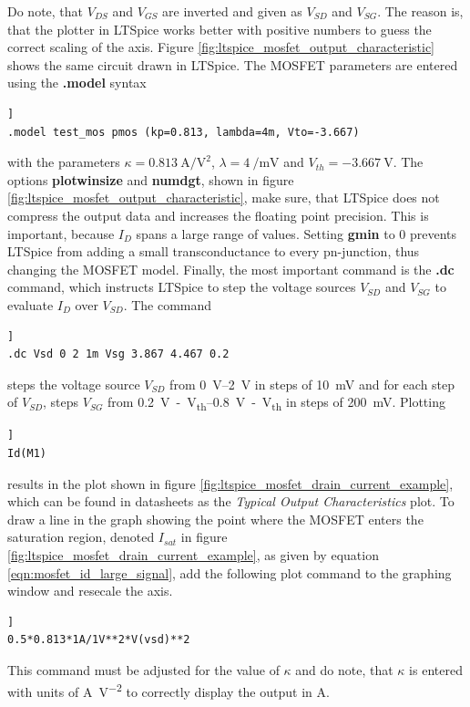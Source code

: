 \documentclass[12pt]{book}
\begin{document}
Do note, that $V_{DS}$ and $V_{GS}$ are inverted and given as $V_{SD}$ and $V_{SG}$. The reason is, that the plotter in LTSpice works better with positive numbers to guess the correct scaling of the axis. Figure \ref{fig:ltspice_mosfet_output_characteristic} shows the same circuit drawn in LTSpice. The MOSFET parameters are entered using the \textbf{.model} syntax
\begin{lstlisting}[frame=single, xleftmargin=5mm, xrightmargin=5mm, columns=fullflexible, morekeywords={model, dc}, keywordstyle=\bfseries, basicstyle=\rmfamily]]
.model test_mos pmos (kp=0.813, lambda=4m, Vto=-3.667)
\end{lstlisting}
with the parameters $\kappa = \qty[per-mode=power]{0.813}{\ampere \per \square\volt}$, $\lambda = \qty[per-mode=power]{4}{\per \milli \volt}$ and $V_{th} = \qty{-3.667}{\V}$. The options \textbf{plotwinsize} and \textbf{numdgt}, shown in figure \ref{fig:ltspice_mosfet_output_characteristic}, make sure, that LTSpice does not compress the output data and increases the floating point precision. This is important, because $I_D$ spans a large range of values. Setting \textbf{gmin} to \num{0} prevents LTSpice from adding a small transconductance to every pn-junction, thus changing the MOSFET model. Finally, the most important command is the \textbf{.dc} command, which instructs LTSpice to step the voltage sources $V_{SD}$ and $V_{SG}$ to evaluate $I_D$ over $V_{SD}$. The command
\begin{lstlisting}[frame=single, xleftmargin=5mm, xrightmargin=5mm, columns=fullflexible, morekeywords={model, dc}, keywordstyle=\bfseries, basicstyle=\rmfamily]]
.dc Vsd 0 2 1m Vsg 3.867 4.467 0.2
\end{lstlisting}
steps the voltage source $V_{SD}$ from \qtyrange[range-units = single]{0}{2}{\V} in steps of \qty{10}{\mV} and for each step of $V_{SD}$, steps $V_{SG}$ from \qtyrange[range-units = single]{0.2}{0.8}{\V -  V_{th}} in steps of \qty{200}{\mV}. Plotting
\begin{lstlisting}[frame=single, xleftmargin=5mm, xrightmargin=5mm, columns=fullflexible, morekeywords={model, dc}, keywordstyle=\bfseries, basicstyle=\rmfamily]]
Id(M1)
\end{lstlisting}
results in the plot shown in figure \ref{fig:ltspice_mosfet_drain_current_example}, which can be found in datasheets as the \textit{Typical Output Characteristics} plot.
To draw a line in the graph showing the point where the MOSFET enters the saturation region, denoted $I_{sat}$ in figure \ref{fig:ltspice_mosfet_drain_current_example}, as given by equation \ref{eqn:mosfet_id_large_signal}, add the following plot command to the graphing window and resecale the axis.
\begin{lstlisting}[frame=single, xleftmargin=5mm, xrightmargin=5mm, columns=fullflexible, morekeywords={model, dc}, keywordstyle=\bfseries, basicstyle=\rmfamily]]
0.5*0.813*1A/1V**2*V(vsd)**2
\end{lstlisting}
This command must be adjusted for the value of $\kappa$ and do note, that $\kappa$ is entered with units of \unit{\A \per \square\volt} to correctly display the output in \unit{\A}.
\end{document}
